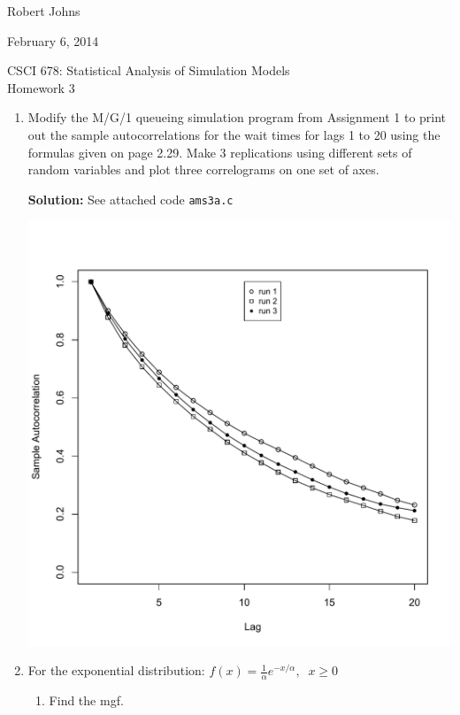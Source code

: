 \documentclass[11pt]{article} %
\begin{document}
\hfill Robert Johns

\hfill February 6, 2014

\begin{center} {\Large CSCI 678: Statistical Analysis of Simulation Models}\\{\large Homework 3}\end{center}

\begin{enumerate}

\item Modify the M/G/1 queueing simulation program from Assignment 1 to print out the sample autocorrelations for the wait times for lags 1 to 20 using the formulas given on page 2.29.  Make 3 replications using different sets of random variables and plot three correlograms on one set of axes.

{\bf Solution:} See attached code \texttt{ams3a.c}

\includegraphics[scale = .6]{plot.pdf}

\item For the exponential distribution: $f(x) = \frac{1}{\alpha}e^{-x/\alpha},\;\; x \ge 0$

\begin{enumerate}

\item Find the mgf.


\end{enumerate}
\end{enumerate}
\end{document}
